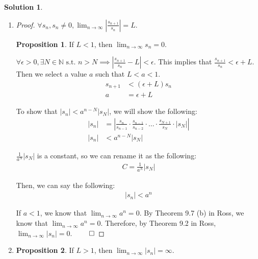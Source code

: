 \documentclass[12pt]{article}
\theoremstyle{definition} %
\newtheorem{solution}{Solution}
\newtheorem*{proposition}{Proposition}
\theoremstyle{plain} %
\begin{document}
\begin{solution}
    \begin{enumerate}
        \item \begin{proof}
        \(\forall s_n, s_n \neq 0, \lim_{n \to \infty} \left| \frac{s_{n+1}}{s_n} \right| = L.\)
    
        \begin{proposition}
             If \(L < 1\), then \(\lim_{n \to \infty} s_n = 0.\)
        \end{proposition}
    
        \(\forall \epsilon > 0, \exists N \in \mathbb{N} \text{ s.t. } n > N \implies \left| \frac{s_{n+1}}{s_n} - L \right| < \epsilon.\)
        This implies that \(\frac{s_{n+1}}{s_n} < \epsilon + L.\) Then we select a value \(a\) such that \(L < a < 1.\)
        \begin{align}
            s_{n+1} &< (\epsilon + L) s_n \tag{1} \\
            a &= \epsilon + L \tag{2}
        \end{align}
    
        To show that \(|s_n| < a^{n-N} |s_N|\), we will show the following:
        \begin{align}
            |s_n| &= \left| \frac{s_n}{s_{n-1}} \cdot \frac{s_{n-1}}{s_{n-2}} \cdot \dots \cdot \frac{s_{N+1}}{s_N} \cdot |s_N| \right| \tag{4} \\
            |s_n| &< a^{n-N} |s_N| \tag{5}
        \end{align}
    
        \(\frac{1}{a^N} |s_N|\) is a constant, so we can rename it as the following:
        \begin{align}
            C = \frac{1}{a^N} |s_N| \tag{6}
        \end{align}
    
        Then, we can say the following:
        \begin{align}
            |s_n| < a^n \tag{7}
        \end{align}
    
        If \(a < 1\), we know that \(\lim_{n \to \infty} a^n = 0.\) By Theorem 9.7 (b) in Ross, we know that \(\lim_{n \to \infty} a^n = 0.\)
        Therefore, by Theorem 9.2 in Ross, \(\lim_{n \to \infty} |s_n| = 0.\) \(\qed\)
    \end{proof}
\item    \begin{proposition}
         If \(L > 1\), then \(\lim_{n \to \infty} |s_n| = \infty.\)
    \end{proposition}
    

\end{enumerate}
\end{solution}
\end{document}
